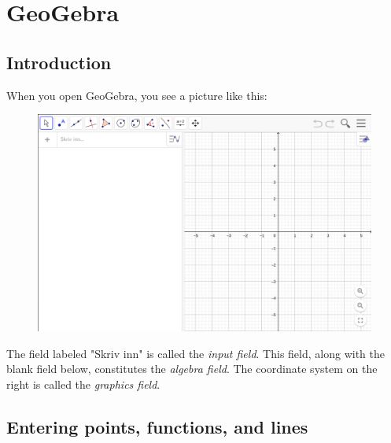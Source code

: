 





\section{GeoGebra}
\subsection{Introduction}
When you open GeoGebra, you see a picture like this:
\begin{figure}[H]
	\centering
	\includegraphics[scale=0.1]{ggbalgoggraf}
\end{figure}
The field labeled "Skriv inn" is called the \textit{input field}. This field, along with the blank field below, constitutes the \textit{algebra field}. The coordinate system on the right is called the \textit{graphics field}.

\subsection{Entering points, functions, and lines}
